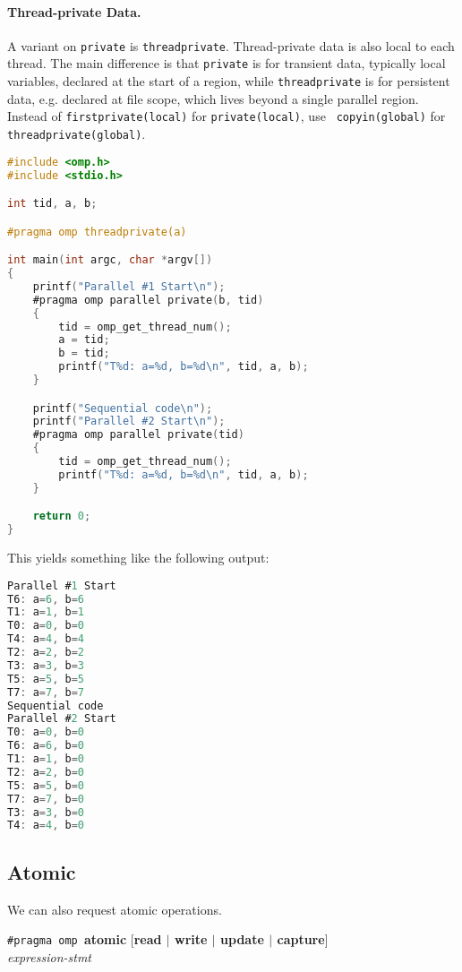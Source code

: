 \paragraph{Thread-private Data.} A variant on {\tt private} is
{\tt threadprivate}. Thread-private data is also local to each
thread. The main difference is that {\tt private} is for transient
data, typically local variables, declared at the start of a region,
while {\tt threadprivate} is for persistent data, e.g. declared at
file scope, which lives beyond a single parallel region. Instead of
{\tt firstprivate(local)} for {\tt private(local)}, use {\tt
  copyin(global)} for {\tt threadprivate(global)}.

\begin{lstlisting}[language=C,morekeywords={foreach,pragma,omp,parallel,single,nowait,task,untied,barrier,taskyield}]
#include <omp.h>
#include <stdio.h>

int tid, a, b;

#pragma omp threadprivate(a)

int main(int argc, char *argv[])
{
    printf("Parallel #1 Start\n");
    #pragma omp parallel private(b, tid)
    {
        tid = omp_get_thread_num();
        a = tid;
        b = tid;
        printf("T%d: a=%d, b=%d\n", tid, a, b);
    }

    printf("Sequential code\n");
    printf("Parallel #2 Start\n");
    #pragma omp parallel private(tid)
    {
        tid = omp_get_thread_num();
        printf("T%d: a=%d, b=%d\n", tid, a, b);
    }

    return 0;
}    
  \end{lstlisting}
This yields something like the following output:
\begin{lstlisting}[language=C,morekeywords={foreach,pragma,omp,parallel,single,nowait,task,untied,barrier,taskyield}]
% ./a.out
Parallel #1 Start
T6: a=6, b=6
T1: a=1, b=1
T0: a=0, b=0
T4: a=4, b=4
T2: a=2, b=2
T3: a=3, b=3
T5: a=5, b=5
T7: a=7, b=7
Sequential code
Parallel #2 Start
T0: a=0, b=0
T6: a=6, b=0
T1: a=1, b=0
T2: a=2, b=0
T5: a=5, b=0
T7: a=7, b=0
T3: a=3, b=0
T4: a=4, b=0
\end{lstlisting}

  \subsection*{Atomic}
We can also request atomic operations.
  \begin{center}
    {\tt \#pragma omp }{\bf atomic} [{\bf read $\mid$ write $\mid$ update $\mid$ capture}]\\
    {\it expression-stmt}
  \end{center}
  
